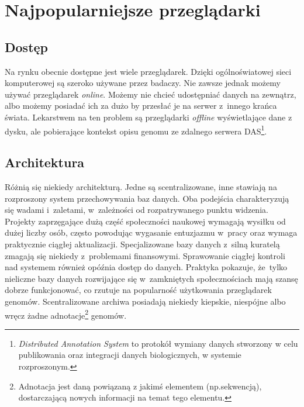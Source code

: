 \documentclass[a4paper,12pt,oneside]{mwrep}  %
\begin{document}
\section{Najpopularniejsze przeglądarki}
\subsection{Dostęp}
Na rynku obecnie dostępne jest wiele przeglądarek. Dzięki ogólnoświatowej sieci komputerowej są szeroko używane przez badaczy. Nie zawsze jednak możemy używać przeglądarek \emph{online}. Możemy nie chcieć udostępniać danych na zewnątrz, albo możemy posiadać ich za dużo by przesłać je na serwer z~innego krańca świata. Lekarstwem na ten problem są przeglądarki \emph{offline} wyświetlające dane z dysku, ale pobierające kontekst opisu genomu ze zdalnego serwera DAS\footnote{\emph{Distributed Annotation System} to protokół wymiany danych stworzony w celu publikowania oraz integracji danych biologicznych, w systemie rozproszonym.}.
\subsection{Architektura}
Różnią się niekiedy architekturą. Jedne są scentralizowane, inne stawiają na rozproszony system przechowywania baz danych. Oba podejścia charakteryzują się wadami i~zaletami, w~zależności od rozpatrywanego punktu widzenia. Projekty zaprzęgające dużą część społeczności naukowej wymagają wysiłku od dużej liczby osób, często powodując wygasanie entuzjazmu w~pracy oraz wymaga praktycznie ciągłej aktualizacji. Specjalizowane bazy danych z~silną kuratelą %
zmagają się niekiedy z~problemami finansowymi. Sprawowanie ciągłej kontroli nad systemem również opóźnia dostęp do danych. Praktyka pokazuje, że~tylko nieliczne bazy danych rozwijające się w~zamkniętych społecznościach mają szansę dobrze funkcjonować, co rzutuje na popularność użytkowania przeglądarek genomów. Scentralizowane archiwa %
posiadają niekiedy kiepskie, niespójne albo wręcz żadne adnotacje\footnote{Adnotacja jest daną powiązaną z jakimś elementem (np.sekwencją), dostarczającą nowych informacji na temat tego elementu.} genomów.
\end{document}
